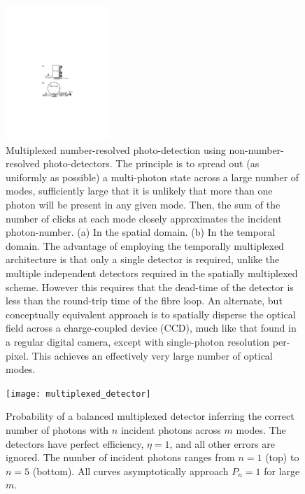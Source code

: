 \begin{figure}[!htbp]
\includegraphics[width=0.35\textwidth]{detector_multiplexing}
\caption{Multiplexed number-resolved photo-detection using non-number-resolved photo-detectors. The principle is to spread out (as uniformly as possible) a multi-photon state across a large number of modes, sufficiently large that it is unlikely that more than one photon will be present in any given mode. Then, the sum of the number of clicks at each mode closely approximates the incident photon-number. (a) In the spatial domain. (b) In the temporal domain. The advantage of employing the temporally multiplexed architecture is that only a single detector is required, unlike the multiple independent detectors required in the spatially multiplexed scheme. However this requires that the dead-time of the detector is less than the round-trip time of the fibre loop. An alternate, but conceptually equivalent approach is to spatially disperse the optical field across a charge-coupled device (CCD), much like that found in a regular digital camera, except with single-photon resolution per-pixel. This achieves an effectively very large number of optical modes.} \label{fig:det_mult}
\end{figure}

\begin{figure}[!htbp]
	\texttt{[image: multiplexed\_detector]}
	\caption{Probability of a balanced multiplexed detector inferring the correct number of photons with $n$ incident photons across $m$ modes. The detectors have perfect efficiency, \mbox{$\eta=1$}, and all other errors are ignored. The number of incident photons ranges from \mbox{$n=1$} (top) to \mbox{$n=5$} (bottom). All curves asymptotically approach \mbox{$P_n=1$} for large $m$.}\label{fig:multiplexed_pd}
\end{figure}

%
%

